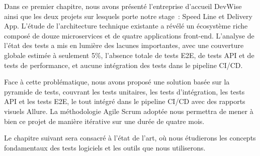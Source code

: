 Dans ce premier chapitre, nous avons présenté l'entreprise d'accueil DevWise ainsi que les deux projets sur lesquels porte notre stage~: Speed Line et Delivery App. L'étude de l'architecture technique existante a révélé un écosystème riche composé de douze microservices et de quatre applications front-end. L'analyse de l'état des tests a mis en lumière des lacunes importantes, avec une couverture globale estimée à seulement 5\%, l'absence totale de tests E2E, de tests API et de tests de performance, et aucune intégration des tests dans le pipeline CI/CD.

Face à cette problématique, nous avons proposé une solution basée sur la pyramide de tests, couvrant les tests unitaires, les tests d'intégration, les tests API et les tests E2E, le tout intégré dans le pipeline CI/CD avec des rapports visuels Allure. La méthodologie Agile Scrum adoptée nous permettra de mener à bien ce projet de manière itérative sur une durée de quatre mois.

Le chapitre suivant sera consacré à l'état de l'art, où nous étudierons les concepts fondamentaux des tests logiciels et les outils que nous utiliserons.
